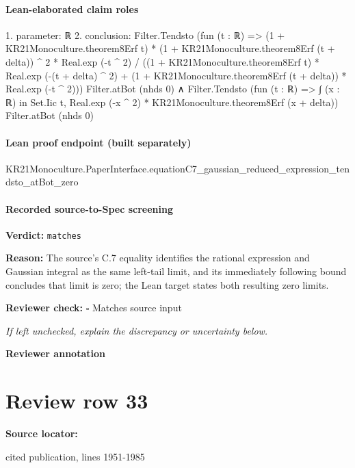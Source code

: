 \documentclass[10pt]{article}
\newcommand{\reviewerbox}{%
  \par\noindent\fbox{\parbox{0.96\linewidth}{\rule{0pt}{0.38in}}}\par
}
\newcommand{\reviewmatch}[1]{%
  \par\noindent\textbf{Reviewer check:} $\square$\; #1\par
  \noindent\emph{If left unchecked, explain the discrepancy or uncertainty below.}\par
}
\begin{document}
\paragraph{Lean-elaborated claim roles}\begin{ReviewVerbatim}
1. parameter: ℝ
2. conclusion: Filter.Tendsto
    (fun (t : ℝ) =>
      (1 + KR21Monoculture.theorem8Erf t) * (1 + KR21Monoculture.theorem8Erf (t + delta)) ^ 2 * Real.exp (-t ^ 2) /
        ((1 + KR21Monoculture.theorem8Erf t) * Real.exp (-(t + delta) ^ 2) +
          (1 + KR21Monoculture.theorem8Erf (t + delta)) * Real.exp (-t ^ 2)))
    Filter.atBot (nhds 0) ∧
  Filter.Tendsto (fun (t : ℝ) => ∫ (x : ℝ) in Set.Iic t, Real.exp (-x ^ 2) * KR21Monoculture.theorem8Erf (x + delta))
    Filter.atBot (nhds 0)
\end{ReviewVerbatim}

\paragraph{Lean proof endpoint (built separately)}\begin{ReviewVerbatim}
KR21Monoculture.PaperInterface.equationC7_gaussian_reduced_expression_tendsto_atBot_zero
\end{ReviewVerbatim}

\paragraph{Recorded source-to-Spec screening}
\textbf{Verdict:} \texttt{matches}
\\
{\raggedright
\textbf{Reason:} The source's C.\allowbreak{}7 equality identifies the rational expression and Gaussian integral as the same left-\allowbreak{}tail limit, and its immediately following bound concludes that limit is zero;\allowbreak{} the Lean target states both resulting zero limits.\allowbreak{}
\par}
\reviewmatch{Matches source input}
\noindent\textbf{Reviewer annotation}\par
\reviewerbox
\clearpage
\hypertarget{source-claim-2c9d403cd319b538}{}
\section*{Review row 33}
\textbf{Source locator:} {\footnotesize\raggedright cited publication, lines 1951-\allowbreak{}1985\par}
\end{document}
